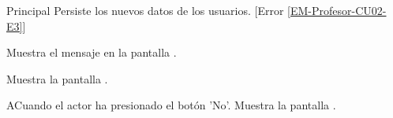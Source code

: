 \begin{UCtrayectoria}{Principal}
	\UCpaso Persiste los nuevos datos de los usuarios. [Error \ref{EM-Profesor-CU02-E3}]

	\UCpaso Muestra el mensaje  en la pantalla .

	\UCpaso Muestra la pantalla .
\end{UCtrayectoria}

\begin{UCtrayectoriaA}{A}{Cuando el actor ha presionado el botón 'No'.}
	\UCpaso Muestra la pantalla .
\end{UCtrayectoriaA}


